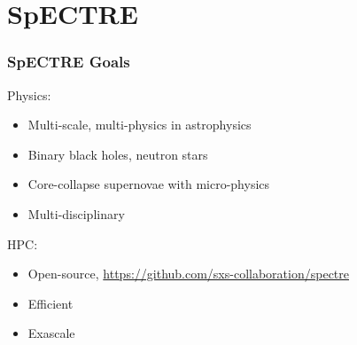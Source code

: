 \documentclass[svgnames,tikz,serif,ragged2e]{beamer}
\begin{document}
\makeatletter

\makeatother


\begin{frame}
  \titlepage{}
\end{frame}

\section{SpECTRE}


\begin{frame}
  \frametitle{SpECTRE Goals}
  Physics:
  \begin{itemize}
  \item Multi-scale, multi-physics in astrophysics
  \item Binary black holes, neutron stars
  \item Core-collapse supernovae with micro-physics
  \item Multi-disciplinary
  \end{itemize}
  HPC:\@
  \begin{itemize}
  \item Open-source, \url{https://github.com/sxs-collaboration/spectre}
  \item Efficient
  \item Exascale
  \end{itemize}
\end{frame}
\end{document}

